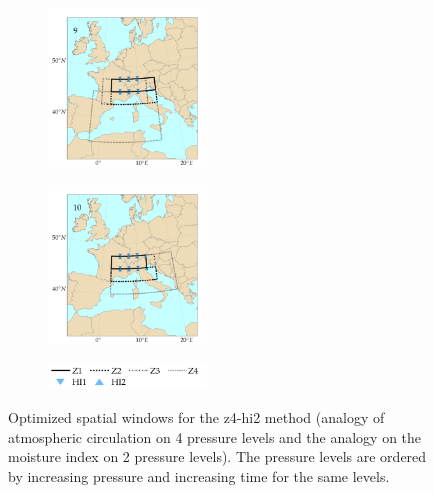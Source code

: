 \documentclass[5p]{elsarticle}
\begin{document}
\begin{figure}[htb]
\begin{subfigure}{.5\columnwidth}
	\end{subfigure}
	\begin{subfigure}{.5\columnwidth}
		\centering
		\includegraphics[width=4.2cm]{figures/spatial_win_z4-hi2/Spatial_windows_9.png}
	\end{subfigure}%
	\begin{subfigure}{.5\columnwidth}
		\centering
		\includegraphics[width=4.2cm]{figures/spatial_win_z4-hi2/Spatial_windows_10.png}
	\end{subfigure}
	\begin{subfigure}{.5\columnwidth}
		\centering
		\includegraphics[width=4.2cm]{figures/spatial_win_z4-hi2/legend.png}
	\end{subfigure}
	\caption{Optimized spatial windows for the z4-hi2 method (analogy of atmospheric circulation on 4 pressure levels and the analogy on the moisture index on 2 pressure levels). The pressure levels are ordered by increasing pressure and increasing time for the same levels.}
	\label{fig:spatial_windows_z4-hi2}
\end{figure}
\end{document}
